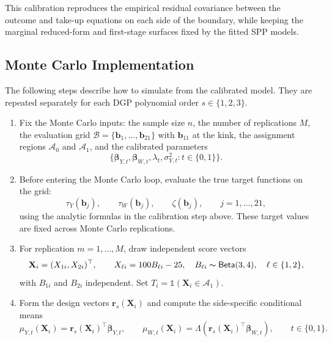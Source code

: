 \documentclass[10pt]{article}
\newcommand{\Indicator}{\mathds{1}}
\newcommand{\bb}{\mathbf{b}}
\newcommand{\br}{\mathbf{r}}
\newcommand{\bX}{\mathbf{X}}
\newcommand{\bbeta}{\boldsymbol{\beta}}
\newcommand{\A}{\mathcal{A}}
\newcommand{\B}{\mathcal{B}}
\begin{document}
This calibration reproduces the empirical residual covariance between the outcome and take-up equations on each side of the boundary, while keeping the marginal reduced-form and first-stage surfaces fixed by the fitted SPP models.

\subsection{Monte Carlo Implementation}

The following steps describe how to simulate from the calibrated model. They are repeated separately for each DGP polynomial order $s\in\{1,2,3\}$.

\begin{enumerate}[label=\normalfont Step \arabic*.,leftmargin=*]
    \item Fix the Monte Carlo inputs: the sample size $n$, the number of replications $M$, the evaluation grid $\B=\{\bb_1,\ldots,\bb_{21}\}$ with $\bb_{11}$ at the kink, the assignment regions $\A_0$ and $\A_1$, and the calibrated parameters
    \[
        \{\bbeta_{Y,t},\bbeta_{W,t},\lambda_t,\sigma_{Y,t}^2:t\in\{0,1\}\}.
    \]

    \item Before entering the Monte Carlo loop, evaluate the true target functions on the grid:
    \[
        \tau_Y(\bb_j),\qquad
        \tau_W(\bb_j),\qquad
        \zeta(\bb_j),
        \qquad j=1,\ldots,21,
    \]
    using the analytic formulas in the calibration step above. These target values are fixed across Monte Carlo replications.

    \item For replication $m=1,\ldots,M$, draw independent score vectors
    \[
        \bX_i=(X_{1i},X_{2i})^\top,
        \qquad
        X_{\ell i}=100B_{\ell i}-25,\quad
        B_{\ell i}\thicksim\mathsf{Beta}(3,4),
        \quad \ell\in\{1,2\},
    \]
    with $B_{1i}$ and $B_{2i}$ independent. Set $T_i=\Indicator(\bX_i\in\A_1)$.

    \item Form the design vectors $\br_s(\bX_i)$ and compute the side-specific conditional means
    \[
        \mu_{Y,t}(\bX_i)=\br_s(\bX_i)^\top\bbeta_{Y,t},
        \qquad
        \mu_{W,t}(\bX_i)=\Lambda(\br_s(\bX_i)^\top\bbeta_{W,t}),
        \qquad t\in\{0,1\}.
    \]


\end{enumerate}
\end{document}
